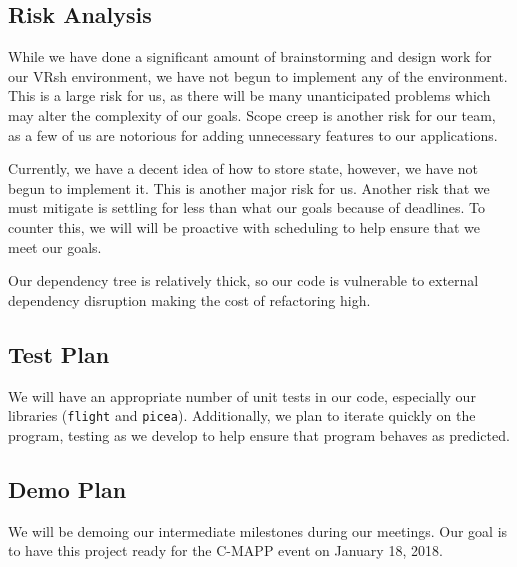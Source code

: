 \documentclass[titlepage,12pt]{article}
\newcommand\name{VRsh}
\begin{document}
\subsection{Risk Analysis}
While we have done a significant amount of brainstorming and design work for our
{\name} environment, we have not begun to implement any of the environment.
This is a large risk for us, as there will be many unanticipated problems which
may alter the complexity of our goals. Scope creep is another risk for our team,
as a few of us are notorious for adding unnecessary features to our
applications.

Currently, we have a decent idea of how to store state, however, we have not
begun to implement it. This is another major risk for us. Another risk that we
must mitigate is settling for less than what our goals because of deadlines. To
counter this, we will will be proactive with scheduling to help ensure that we
meet our goals.

Our dependency tree is relatively thick, so our code is vulnerable to external
dependency disruption making the cost of refactoring high.

\subsection{Test Plan}
We will have an appropriate number of unit tests in our code, especially our
libraries (\texttt{flight} and \texttt{picea}). Additionally, we plan to iterate
quickly on the program, testing as we develop to help ensure that program
behaves as predicted.

\subsection{Demo Plan}
We will be demoing our intermediate milestones during our meetings. Our goal is
to have this project ready for the C-MAPP event on January 18, 2018.
\end{document}
